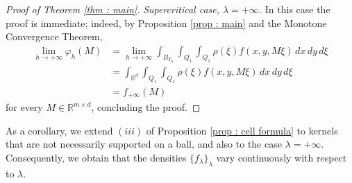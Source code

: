 \documentclass{article}
\theoremstyle{definition}
\newcommand{\f}{\varphi}
\newcommand{\R}{\mathbb{R}}
\begin{document}
\begin{proof}[Proof of Theorem \ref{thm : main}]
\medskip

{\em Supercritical case, $\lambda=+\infty$.} In this case the proof is immediate; indeed, by Proposition \ref{prop : main} and the Monotone Convergence Theorem,
\begin{align*}
    \lim_{h\to+\infty}\f_h(M) & = \lim_{h\to+\infty}\int_{B_{T_h}} \int_{Q_1}\int_{Q_1} \rho(\xi)f(x,y,M\xi)\, dx\,dy\,d\xi \\
    & =\int_{\R^d} \int_{Q_1}\int_{Q_1} \rho(\xi) f(x,y,M\xi)\, dx\,dy\,d\xi \\
    & = f_{+\infty}(M)
\end{align*}
for every $M\in \R^{m\times d}$, concluding the proof.
\end{proof}

As a corollary, we extend $(iii)$ of Proposition \ref{prop : cell formula} to kernels that are not necessarily supported on a ball, and also to the case $\lambda=+\infty$. Consequently, we obtain that the densities $\{f_\lambda\}_\lambda$ vary continuously with respect to $\lambda$. 
\end{document}
